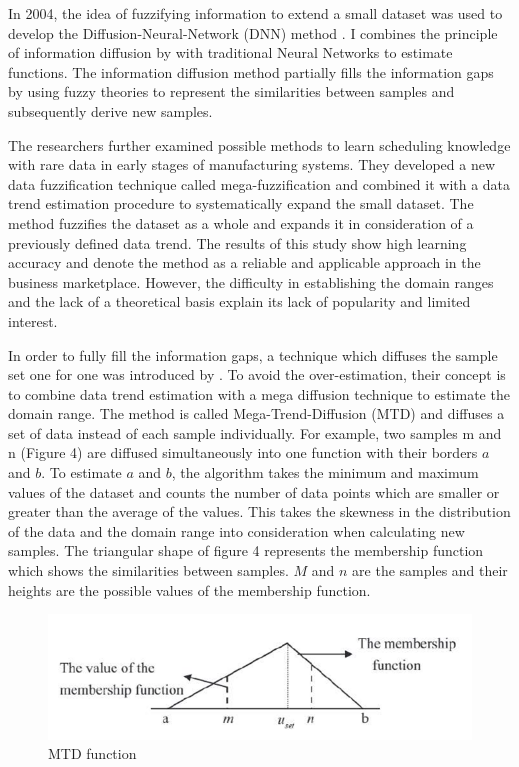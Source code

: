 \documentclass[parskip=full]{scrartcl}
\begin{document}
In 2004, the idea of fuzzifying information to extend a small dataset was used 
to develop the Diffusion-Neural-Network (DNN) method \cite{Huang.2004}. I 
combines the principle of information diffusion by \cite{Huang.1997} with 
traditional Neural Networks to estimate functions. The information diffusion 
method partially fills the information gaps by using fuzzy theories to 
represent the similarities between samples and subsequently derive new samples. 

The researchers \cite{Li.2006b} further examined possible methods to learn
scheduling knowledge with rare data in early stages of manufacturing systems.
They developed a new data fuzzification technique called mega-fuzzification and
combined it with a data trend estimation procedure to systematically expand the
small dataset. The method fuzzifies the dataset as a whole and expands it in
consideration of a previously defined data trend. The results of this study 
show high learning accuracy and denote the method as a reliable and applicable 
approach in the business marketplace. However, the difficulty in establishing 
the domain ranges and the lack of a theoretical basis explain its lack of 
popularity and limited interest. 

In order to fully fill the information gaps, a technique which diffuses the
sample set one for one was introduced by \cite{Li.2007}. To avoid the
over-estimation, their concept is to combine data trend estimation with a mega
diffusion technique to estimate the domain range. The method is called
Mega-Trend-Diffusion (MTD) and diffuses a set of data instead of each sample
individually. For example, two samples m and n (Figure 4) are diffused
simultaneously into one function with their borders $\mathit{a}$ and 
$\mathit{b}$. To estimate $\mathit{a}$ and $\mathit{b}$, the algorithm takes 
the minimum and maximum values of the dataset and counts the number of data 
points which are smaller or greater than the average of the values. This takes 
the skewness in the distribution of the data and the domain range into 
consideration when calculating new samples. The triangular shape of figure 4 
represents the membership function which shows the similarities between 
samples. $\mathit{M}$ and $\mathit{n}$ are the samples and their heights are 
the possible values of the membership function.

\begin{figure}[H]
	\centering
	\includegraphics[width=0.7\linewidth]{"./Resources/mtd_function"}
	\caption{MTD function}
	\label{fig:mtd-function}
\end{figure}
\end{document}

